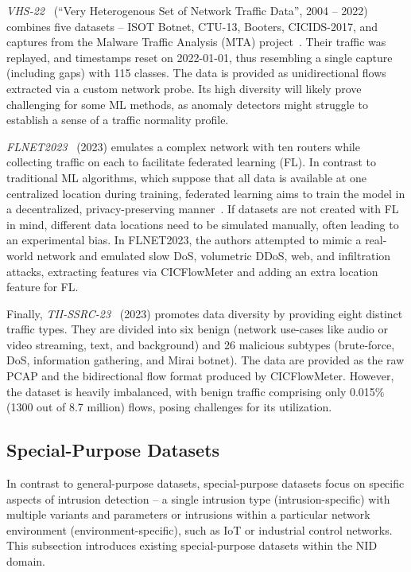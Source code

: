 \emph{VHS-22}~\cite{szumelda2022_vhs22_dataset} (``Very Heterogenous Set of Network Traffic Data'', 2004 -- 2022) combines five datasets -- ISOT Botnet, CTU-13, Booters, CICIDS-2017, and captures from the Malware Traffic Analysis (MTA) project~\cite{duncan2024_malware_traffic_analysis}. Their traffic was replayed, and timestamps reset on 2022-01-01, thus resembling a single capture (including gaps) with 115 classes. The data is provided as unidirectional flows extracted via a custom network probe. Its high diversity will likely prove challenging for some ML methods, as anomaly detectors might struggle to establish a sense of a traffic normality profile.

\emph{FLNET2023}~\cite{kumar2023_flnet2023} (2023) emulates a complex network with ten routers while collecting traffic on each to facilitate federated learning (FL). In contrast to traditional ML algorithms, which suppose that all data is available at one centralized location during training, federated learning aims to train the model in a decentralized, privacy-preserving manner~\cite{zhang2021_survey_federated_learning}. If datasets are not created with FL in mind, different data locations need to be simulated manually, often leading to an experimental bias. In FLNET2023, the authors attempted to mimic a real-world network and emulated slow DoS, volumetric DDoS, web, and infiltration attacks, extracting features via CICFlowMeter and adding an extra location feature for FL.

Finally, \emph{TII-SSRC-23}~\cite{heryalla2023_tii_src23} (2023) promotes data diversity by providing eight distinct traffic types. They are divided into six benign (network use-cases like audio or video streaming, text, and background) and 26 malicious subtypes (brute-force, DoS, information gathering, and Mirai botnet). The data are provided as the raw PCAP and the bidirectional flow format produced by CICFlowMeter. However, the dataset is heavily imbalanced, with benign traffic comprising only 0.015\% (1300 out of 8.7 million) flows, posing challenges for its utilization.

\subsection{Special-Purpose Datasets}
\label{ssec:ndatasurv_data_special}

In contrast to general-purpose datasets, special-purpose datasets focus on specific aspects of intrusion detection -- a single intrusion type (intrusion-specific) with multiple variants and parameters or intrusions within a particular network environment (environment-specific), such as IoT or industrial control networks. This subsection introduces existing special-purpose datasets within the NID domain.

